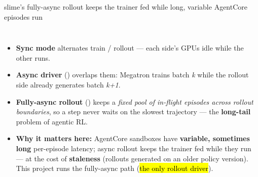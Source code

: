 \begin{frame}{slime's fully-async rollout keeps the trainer fed while long, variable AgentCore episodes run}
\begin{columns}[T]
\begin{itemize}\scriptsize\setlength{\itemsep}{0.8mm}
\item \textbf{Sync mode} alternates train / rollout --- each side's GPUs idle while the other runs.
\item \textbf{Async driver} () overlaps them: Megatron trains batch \emph{k} while the rollout side already generates batch \emph{k+1}.
\item \textbf{Fully-async rollout} () keeps a \emph{fixed pool of in-flight episodes across rollout boundaries}, so a step never waits on the slowest trajectory --- the \textbf{long-tail} problem of agentic RL.
\item \textbf{Why it matters here:} AgentCore sandboxes have \textbf{variable, sometimes long} per-episode latency; async rollout keeps the trainer fed while they run --- at the cost of \textbf{staleness} (rollouts generated on an older policy version). This project runs the fully-async path (\hl{the only rollout driver}).
\end{itemize}
\end{columns}
\end{frame}


